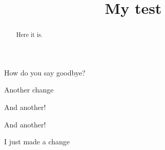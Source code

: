 \documentclass{ximera}
\title{My test}
\begin{document}
\begin{abstract}
  Here it is.
\end{abstract}
\maketitle


\begin{multipleChoice}
  How do you say goodbye?
\end{multipleChoice}

Another change

And another!

And another!

I just made a change
\end{document}
